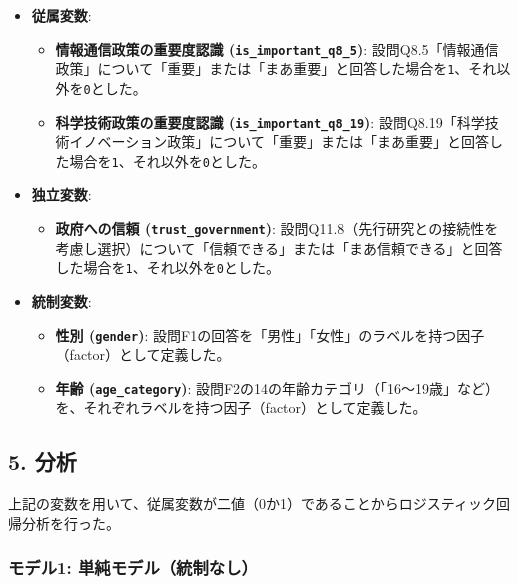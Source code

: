 \documentclass[
  xelatex]{bxjsarticle}
\providecommand{\tightlist}{%
  \setlength{\itemsep}{0pt}\setlength{\parskip}{0pt}}
\begin{document}
\begin{itemize}
\tightlist
\item
  \textbf{従属変数}:

  \begin{itemize}
  \tightlist
  \item
    \textbf{情報通信政策の重要度認識 (\texttt{is\_important\_q8\_5})}:
    設問Q8.5「情報通信政策」について「重要」または「まあ重要」と回答した場合を\texttt{1}、それ以外を\texttt{0}とした。
  \item
    \textbf{科学技術政策の重要度認識 (\texttt{is\_important\_q8\_19})}:
    設問Q8.19「科学技術イノベーション政策」について「重要」または「まあ重要」と回答した場合を\texttt{1}、それ以外を\texttt{0}とした。
  \end{itemize}
\item
  \textbf{独立変数}:

  \begin{itemize}
  \tightlist
  \item
    \textbf{政府への信頼 (\texttt{trust\_government})}:
    設問Q11.8（先行研究との接続性を考慮し選択）について「信頼できる」または「まあ信頼できる」と回答した場合を\texttt{1}、それ以外を\texttt{0}とした。
  \end{itemize}
\item
  \textbf{統制変数}:

  \begin{itemize}
  \tightlist
  \item
    \textbf{性別 (\texttt{gender})}:
    設問F1の回答を「男性」「女性」のラベルを持つ因子（factor）として定義した。
  \item
    \textbf{年齢 (\texttt{age\_category})}:
    設問F2の14の年齢カテゴリ（「16〜19歳」など）を、それぞれラベルを持つ因子（factor）として定義した。
  \end{itemize}
\end{itemize}

\subsection{5. 分析}\label{ux5206ux6790}

上記の変数を用いて、従属変数が二値（0か1）であることからロジスティック回帰分析を行った。

\subsubsection{モデル1:
単純モデル（統制なし）}\label{ux30e2ux30c7ux30eb1-ux5358ux7d14ux30e2ux30c7ux30ebux7d71ux5236ux306aux3057}
\end{document}

